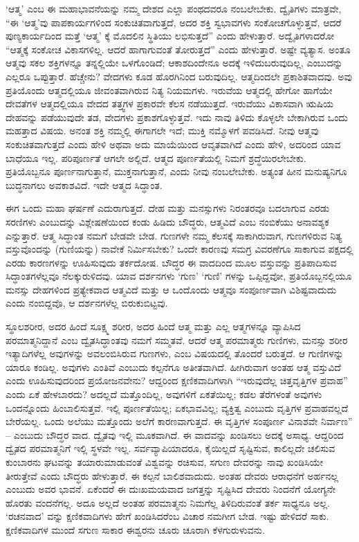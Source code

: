 ‘ಆತ್ಮ’ ಎಂಬ ಈ ಮಹಾಭಾವನೆಯನ್ನು ನಮ್ಮ ದೇಶದ ಎಲ್ಲಾ ಪಂಥದವರೂ ನಂಬಲೇಬೇಕು. ದ್ವೈತಿಗಳು ಮಾತ್ರವೇ, “ಈ ‘ಆತ್ಮ’ವು ಪಾಪಕಾರ್ಯಗಳಿಂದ ಸಂಕುಚಿತವಾಗುತ್ತದೆ, ಅದರ ಶಕ್ತಿ ಸ್ವಭಾವಗಳು ಸಂಕೋಚಗೊಳ್ಳುತ್ತವೆ, ಆದರೆ ಪುಣ್ಯಕಾರ್ಯದಿಂದ ಮತ್ತೆ ‘ಆತ್ಮ’ ಕ್ಕೆ ಮೊದಲಿನ ಸ್ಥಿತಿಯು ಲಭಿಸುತ್ತದೆ” ಎಂದು ಹೇಳುತ್ತಾರೆ. ಅದ್ವೈತಿಗಳಾದರೋ “ಆತ್ಮಕ್ಕೆ ಸಂಕೋಚ ವಿಕಾಸಗಳಿಲ್ಲ. ಆದರೆ ಹಾಗಾಗುವಂತೆ ತೋರುತ್ತದೆ” ಎಂದು ಹೇಳುತ್ತಾರೆ. ಅಷ್ಟೇ ವ್ಯತ್ಯಾಸ. ಅಂತೂ ಆತ್ಮವು ಸಕಲ ಶಕ್ತಿಗಳನ್ನೂ ತನ್ನಲ್ಲಿಯೇ ಒಳಗೊಂಡಿದೆ; ಆಕಾಶದಿಂದೇನೂ ಅದಕ್ಕೆ ಇಳಿದುಬರುವುದಿಲ್ಲ, ಎಂಬುದನ್ನು ಎಲ್ಲರೂ ಒಪ್ಪುತ್ತಾರೆ. ಹೆಚ್ಚೇನು? ವೇದಗಳು ಕೂಡ ಹೊರಗಿನಿಂದ ಬರುವುದಿಲ್ಲ. ಆತ್ಮದಿಂದಲೇ ಪ್ರಕಾಶಿತವಾದವು. ಅವು ಪ್ರತಿಯೊಂದು ಆತ್ಮದಲ್ಲಿಯೂ ಜೀವಂತವಾಗಿರುವ ನಿತ್ಯ ನಿಯಮಗಳು. ಇರುವೆಯ ಆತ್ಮದಲ್ಲಿ ಹೇಗೋ ಹಾಗೆಯೇ ದೇವತೆಗಳ ಆತ್ಮದಲ್ಲಿಯೂ ವೇದದ ತತ್ತ್ವಗಳ ಪ್ರಕಾರವೇ ಕೆಲಸ ನಡೆಯುತ್ತದೆ. ಇರುವೆಯು ವಿಕಾಸವಾಗಿ ಋಷಿಯ ದೇಹವನ್ನು ಪಡೆಯುವುದೇ ತಡ, ವೇದಗಳು ಪ್ರಕಾಶಗೊಳ್ಳುತ್ತವೆ. ಇದು ನಾವು ತಿಳಿದು ಕೊಳ್ಳಲೇ ಬೇಕಾಗಿರುವ ಒಂದು ಮಹತ್ತಾದ ವಿಷಯ. ಅನಂತ ಶಕ್ತಿ ನಮ್ಮಲ್ಲಿ ಈಗಾಗಲೇ ಇದೆ; ಮುಕ್ತಿ ನಮ್ಮೊಳಗೆ ಪವಡಿಸಿದೆ. ನೀವು ಆತ್ಮವು ಸಂಕುಚಿತವಾಗುತ್ತದೆ ಎಂದು ಹೇಳಿ ಅಥವಾ ಅದು ಮಾಯೆಯಿಂದ ಆವೃತವಾಗಿದೆ ಎಂದು ಹೇಳಿ, ಅದರಿಂದ ಯಾವ ಬಾಧೆಯೂ ಇಲ್ಲ. ಪರಿಪೂರ್ಣತೆ ಆಗಲೇ ಅಲ್ಲಿದೆ. ಆತ್ಮದ ಪೂರ್ಣತೆಯಲ್ಲಿ ನಿಮಗೆ ಶ್ರದ್ಧೆಯಿರಲೇಬೇಕು. ಪ್ರತಿಯೊಬ್ಬನೂ ಪೂರ್ಣನಾಗುತ್ತಾನೆ, ಮುಕ್ತನಾಗುತ್ತಾನೆ, ಎಂದು ನೀವು ನಂಬಲೇಬೇಕು. ಅತ್ಯಂತ ಹೀನ ಮನುಷ್ಯನಿಗೂ ಬುದ್ಧನಾಗಲು ಅವಕಾಶವಿದೆ. ಇದೇ ಆತ್ಮದ ಸಿದ್ಧಾಂತ.

ಈಗ ಒಂದು ಮಹಾ ಘರ್ಷಣೆ ಎದುರಾಗುತ್ತದೆ. ದೇಹ ಮತ್ತು ಮನಸ್ಸುಗಳು ನಿರಂತರವೂ ಬದಲಾಗುವ ಎರಡು ಸರಣಿಗಳು ಎಂಬುದನ್ನು ವಿಶ್ಲೇಷಣೆಯಿಂದ ಕಂಡು ಹಿಡಿದು ಬೌದ್ಧರು, ಆತ್ಮವಿದೆ ಎಂಬ ನಂಬಿಕೆಯು ಅನಾವಶ್ಯಕ ಎನ್ನುತ್ತಾರೆ. ಆತ್ಮ ಸಿದ್ಧಾಂತ ನಮಗೆ ಬೇಡವೇ ಬೇಡ. ಗುಣಗಳೇ ನಮ್ಮ ಕೆಲಸಕ್ಕೆ ಸಾಕಾಗಿರುವಾಗ, ಗುಣಗಳಿರುವ ನಿತ್ಯ ವಸ್ತುವೊಂದನ್ನು (ಗುಣಿಯನ್ನು) ನಾವೇಕೆ ನಿರ್ಮಿಸಬೇಕು? ಒಂದೇ ಕಾರಣವು ಸಮಗ್ರ ವಿವರಣೆಗೂ ಸಾಕಾಗುವ ಪಕ್ಷದಲ್ಲಿ ಎರಡು ಕಾರಣಗಳನ್ನು ಊಹಿಸುವುದು ತರ್ಕದೋಷ. ಬೌದ್ಧರ ಈ ವಾದದಿಂದ ಮೂಲ ವಸ್ತುವನ್ನು ಪ್ರತಿಪಾದಿಸುವ ಸಿದ್ಧಾಂತಗಳೆಲ್ಲವೂ ನೆಲಕ್ಕುರುಳಿದವು. ಯಾವ ದರ್ಶನಗಳು ‘ಗುಣ’ ‘ಗುಣಿ’ ಗಳನ್ನು ಒಪ್ಪಿದ್ದವೋ, ಪ್ರತಿಯೊಬ್ಬನಲ್ಲಿಯೂ ಮನಸ್ಸು ದೇಹಗಳಿಂದ ಪ್ರತ್ಯೇಕವಾದ ಆತ್ಮವಿದೆ ಮತ್ತು ಆ ಒಂದೊಂದು ಆತ್ಮವೂ ಸಂಪೂರ್ಣವಾಗಿ ವಿಶಿಷ್ಟವಾದುದು ಎಂದು ನಂಬಿದ್ದವೊ, ಆ ದರ್ಶನಗಳೆಲ್ಲ ಬಿರುಕುಬಿಟ್ಟವು.

ಸ್ಥೂಲಶರೀರ, ಅದರ ಹಿಂದೆ ಸೂಕ್ಷ್ಮ ಶರೀರ, ಅದರ ಹಿಂದೆ ಆತ್ಮ ಮತ್ತು ಎಲ್ಲ ಆತ್ಮಗಳನ್ನೂ ವ್ಯಾಪಿಸಿದ ಪರಮಾತ್ಮನಿದ್ದಾನೆ ಎಂಬ ದ್ವೈತಸಿದ್ಧಾಂತವು ನಮಗೆ ಸಮ್ಮತವೆ. ಆದರೆ ಆತ್ಮ ಪರಮಾತ್ಮರು ಗುಣಿಗಳು, ಮನಸ್ಸು ಶರೀರ ಇತ್ಯಾದಿಗಳೆಲ್ಲ ಅವುಗಳನ್ನು ಅವಲಂಬಿಸಿರುವ ಗುಣಗಳು, ಎಂಬ ವಿಷಯದಲ್ಲಿ ತೊಂದರೆ ಬರುತ್ತದೆ. ಆ ಗುಣಿಗಳನ್ನು ಯಾರೂ ಕಂಡಿಲ್ಲ. ಅವುಗಳು ಎಂತಿವೆ ಎಂಬುದು ಕಲ್ಪನೆಗೂ ಅತೀತವಾಗಿದೆ. ಹೀಗಿರುವಾಗ ಅಂತಹ ಆತ್ಮ ವಸ್ತುವಿದೆ ಎಂದು ಊಹಿಸುವುದರಿಂದ ಪ್ರಯೋಜನವೇನು? ಆದ್ದರಿಂದ ಕ್ಷಣಿಕವಾದಿಗಳಾಗಿ “ಇರುವುದೆಲ್ಲ ಚಿತ್ತವೃತ್ತಿಗಳ ಪ್ರವಾಹ” ಎಂದು ಏಕೆ ಹೇಳಬಾರದು? ಅದಲ್ಲದೆ ಮತ್ತೊಂದಿಲ್ಲ, ಅವುಗಳಿಗೆ ಏಕತೆಯಿಲ್ಲ; ಕಡಲ ತೆರೆಗಳಂತೆ ಅವುಗಳು ಒಂದನ್ನೊಂದು ಹಿಂಬಾಲಿಸುತ್ತವೆ. ಇಲ್ಲಿ ಪೂರ್ಣತೆಯಿಲ್ಲ; ಏಕಭಾವವಿಲ್ಲ; ವ್ಯಕ್ತಿತ್ವ ಎಂಬುದು ವೃತ್ತಿಗಳ ಪ್ರವಾಹವಲ್ಲದೆ ಬೇರೆಯಲ್ಲ. ಒಂದು ಅಲೆಯು ಮತ್ತೊಂದು ಅಲೆಗೆ ಕಾರಣವಾಗುತ್ತದೆ. ಈ ವೃತ್ತಿಗಳ ಸಂಪೂರ್ಣ ವಿನಾಶವೇ ನಿರ್ವಾಣ” – ಎಂಬುದು ಬೌದ್ಧರ ವಾದ. ದ್ವೈತವು ಇಲ್ಲಿ ಮೂಕವಾಗಿದೆ. ಈ ವಾದವನ್ನು ಖಂಡಿಸಲು ಅದಕ್ಕೆ ಅಸಾಧ್ಯ. ಆದ್ದರಿಂದ ದ್ವೈತದ ಪರಮಾತ್ಮನಿಗೆ ಇಲ್ಲಿ ಸ್ಥಳವೇ ಇಲ್ಲ. ಸರ್ವವ್ಯಾಪಿಯಾದರೂ, ಕೈಯಿಲ್ಲದೆ ಸೃಷ್ಟಿಸುವ, ಕಾಲಿಲ್ಲದೇ ಚಲಿಸುವ ಕುಂಬಾರನು ಘಟವನ್ನು ತಯಾರುಮಾಡುವಂತೆ ವಿಶ್ವವನ್ನು ರಚಿಸುವ, ಸಗುಣ ದೇವರನ್ನು ನಾವು ಖಂಡಿಸಿಯೇ ತೀರುತ್ತೇವೆ ಎಂದು ಬೌದ್ಧರು ಹೇಳುತ್ತಾರೆ. ಈ ಕಲ್ಪನೆ ಬಾಲಿಶವಾದುದು. ಅಂತಹ ದೇವರು ಆರಾಧನೆಗೆ ಅರ್ಹನಲ್ಲ ಎಂಬುದು ಅವರ ಭಾವನೆ. ಏಕೆಂದರೆ ಈ ದುಃಖಮಯವಾದ ಜಗತ್ತನ್ನು ಸೃಷ್ಟಿಸಿದ ದೇವರು ನಿಂದನೆಗೆ ಯೋಗ್ಯನೇ ಹೊರತು ವಂದನೆಗಲ್ಲ. ಅದೂ ಅಲ್ಲದೆ ಅಂತಹ ಪರಮಾತ್ಮನು ನಿಮಗೆಲ್ಲ ತಿಳಿದಿರುವಂತೆ ತರ್ಕ ಸಾಧ್ಯನೂ ಅಲ್ಲ. ‘ರಚನವಾದ’  ವನ್ನು ಕ್ಷಣಿಕವಾದಿಗಳು ಹೇಗೆ ಖಂಡಿಸಿದರೆಂಬ ವಿಚಾರ ನಮಗೀಗ ಬೇಡ. ಇಷ್ಟು ಹೇಳಿದರೆ ಸಾಕು. ಕ್ಷಣಿಕವಾದಿಗಳ ಮುಂದೆ ಸಗುಣ ಸಾಕಾರ ಈಶ್ವರನು ಚೂರು ಚೂರಾಗಿ ಕೆಳಗುರುಳುವನು.

